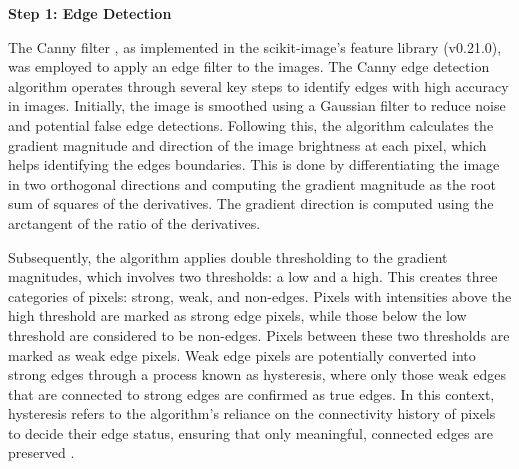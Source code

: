 \documentclass{micro-econ-thesis}
\begin{document}
\textbf{Step 1: Edge Detection}

The Canny filter \parencite{canny_computational_1986}, as implemented in the scikit-image's feature library (v0.21.0), was employed to apply an edge filter to the images. The Canny edge detection algorithm operates through several key steps to identify edges with high accuracy in images. Initially, the image is smoothed using a Gaussian filter to reduce noise and potential false edge detections. Following this, the algorithm calculates the gradient magnitude and direction of the image brightness at each pixel, which helps identifying the edges boundaries. This is done by differentiating the image in two orthogonal directions and computing the gradient magnitude as the root sum of
squares of the derivatives. The gradient direction is computed using the arctangent of the ratio of the derivatives.

Subsequently, the algorithm applies double thresholding to the gradient magnitudes, which involves two thresholds: a low and a high. This creates three categories of pixels: strong, weak, and non-edges. Pixels with intensities above the high threshold are marked as strong edge pixels, while those below the low threshold are considered to be non-edges. Pixels between these two thresholds are marked as weak edge pixels. Weak edge pixels are potentially converted into strong edges through a process known as hysteresis, where only those weak edges that are connected to strong edges are confirmed as true edges. In this context, hysteresis refers to the algorithm's reliance on the connectivity history of pixels to decide their edge status, ensuring that only meaningful, connected edges are preserved \parencite{heath_robust_1997}.  
\end{document}
